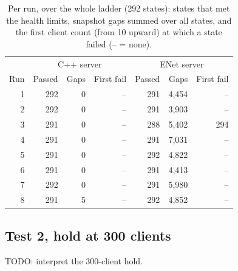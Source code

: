 \begin{table}[H]
\centering
\small
\begin{tabular}{@{}rrrrrrr@{}}
\toprule
& \multicolumn{3}{c}{C++ server} & \multicolumn{3}{c}{ENet server} \\
Run & Passed & Gaps & First fail & Passed & Gaps & First fail \\
\midrule
1 & 292 & 0 & -- & 291 & 4{,}454 & -- \\
2 & 292 & 0 & -- & 291 & 3{,}903 & -- \\
3 & 291 & 0 & -- & 288 & 5{,}402 & 294 \\
4 & 291 & 0 & -- & 291 & 7{,}031 & -- \\
5 & 291 & 0 & -- & 292 & 4{,}822 & -- \\
6 & 291 & 0 & -- & 291 & 4{,}413 & -- \\
7 & 292 & 0 & -- & 291 & 5{,}980 & -- \\
8 & 291 & 5 & -- & 292 & 4{,}852 & -- \\
\bottomrule
\end{tabular}
\caption{Per run, over the whole ladder (292 states): states that met the health limits, snapshot gaps summed over all states, and the first client count (from 10 upward) at which a state failed (-- = none).}
\label{tab:limit}
\end{table}

\subsection{Test 2, hold at 300 clients}
\label{sec:hold300}
TODO: interpret the 300-client hold.

